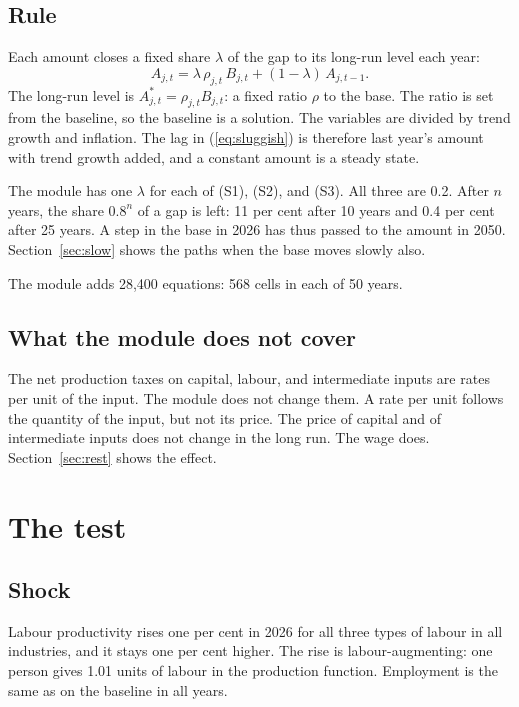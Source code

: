 \documentclass[11pt,a4paper]{article}
\begin{document}
\subsection{Rule}

Each amount closes a fixed share $\lambda$ of the gap to its long-run level each year:
\begin{equation}
A_{j,t} = \lambda\, \rho_{j,t}\, B_{j,t} + (1 - \lambda)\, A_{j,t-1} .
\label{eq:sluggish}
\end{equation}
The long-run level is $A^{*}_{j,t} = \rho_{j,t} B_{j,t}$: a fixed ratio $\rho$ to the base. The ratio is set from the baseline, so the baseline is a solution.
The variables are divided by trend growth and inflation. The lag in (\ref{eq:sluggish}) is therefore last year's amount with trend growth added, and a constant amount is a steady state.

The module has one $\lambda$ for each of (S1), (S2), and (S3). All three are 0.2.
After $n$ years, the share $0.8^{n}$ of a gap is left: 11 per cent after 10 years and 0.4 per cent after 25 years.
A step in the base in 2026 has thus passed to the amount in 2050. Section~\ref{sec:slow} shows the paths when the base moves slowly also.

The module adds 28{,}400 equations: 568 cells in each of 50 years.

\subsection{What the module does not cover}

The net production taxes on capital, labour, and intermediate inputs are rates per unit of the input. The module does not change them.
A rate per unit follows the quantity of the input, but not its price. The price of capital and of intermediate inputs does not change in the long run. The wage does. Section~\ref{sec:rest} shows the effect.

\section{The test}
\label{sec:test}

\subsection{Shock}

Labour productivity rises one per cent in 2026 for all three types of labour in all industries, and it stays one per cent higher.
The rise is labour-augmenting: one person gives 1.01 units of labour in the production function. Employment is the same as on the baseline in all years.
\end{document}
